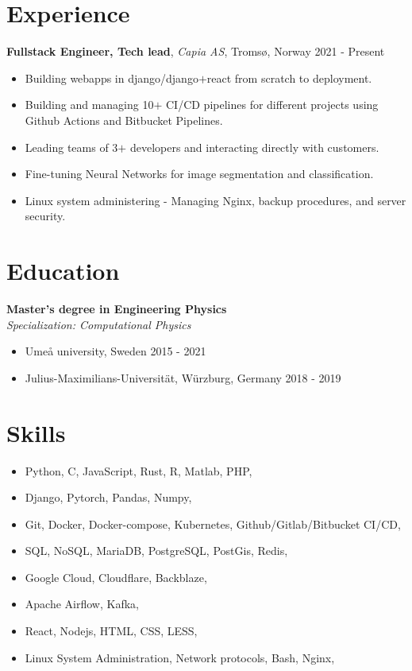 \documentclass[11pt, a4paper]{article}
\begin{document}
\section*{Experience}
\textbf{Fullstack Engineer, Tech lead}, \textit{Capia AS}, Tromsø, Norway \hfill 2021 - Present
\begin{itemize}[noitemsep]
    \item Building webapps in django/django$+$react from scratch to deployment.
    \item Building and managing 10$+$ CI/CD pipelines for different projects using Github Actions and Bitbucket Pipelines.
    \item Leading teams of 3$+$ developers and interacting directly with customers.
    \item Fine-tuning Neural Networks for image segmentation and classification.
    \item Linux system administering - Managing Nginx, backup procedures, and server security.
\end{itemize}

\section*{Education}
\textbf{Master's degree in Engineering Physics}\\
\textit{Specialization: Computational Physics}

\begin{itemize}[noitemsep]
    \item Umeå university, Sweden \hfill 2015 - 2021
    \item Julius-Maximilians-Universität, Würzburg, Germany \hfill 2018 - 2019
\end{itemize}

\section*{Skills}
\begin{itemize}[noitemsep]
    \item Python, C, JavaScript, Rust, R, Matlab, PHP, 
    \item Django, Pytorch, Pandas, Numpy,
    \item Git, Docker, Docker-compose, Kubernetes, Github/Gitlab/Bitbucket CI/CD,
    \item SQL, NoSQL, MariaDB, PostgreSQL, PostGis, Redis,
    \item Google Cloud, Cloudflare, Backblaze,
    \item Apache Airflow, Kafka,
    \item React, Nodejs, HTML, CSS, LESS, 
    \item Linux System Administration, Network protocols, Bash, Nginx,
\end{itemize}
\end{document}
